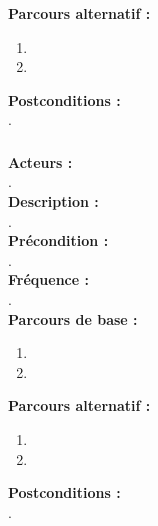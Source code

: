 \documentclass[../rapport.tex]{subfiles}
\begin{document}
\textbf{Parcours alternatif :}
\begin{enumerate}
    \item 
    \item 
\end{enumerate}

\textbf{Postconditions :} \\
. \\



\subsubsection{}

\textbf{Acteurs :} \\
. \\

\textbf{Description :} \\
. \\

\textbf{Précondition :} \\
. \\

\textbf{Fréquence :} \\
. \\

\textbf{Parcours de base :} \\
\begin{enumerate}
    \item 
    \item 
\end{enumerate}
\bigskip

\textbf{Parcours alternatif :}
\begin{enumerate}
    \item 
    \item 
\end{enumerate}

\textbf{Postconditions :} \\
. \\

\newpage
\end{document}
